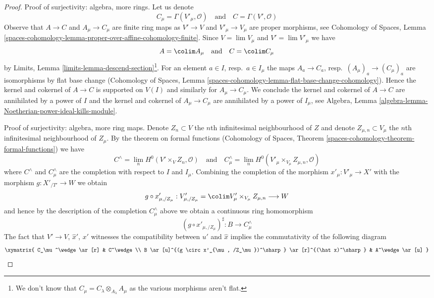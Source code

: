 \begin{proof}
\medskip\noindent
Proof of surjectivity: algebra, more rings.
Let us denote
$$
C_\mu = \Gamma(V'_\mu, \mathcal{O})
\quad\text{and}\quad
C = \Gamma(V', \mathcal{O})
$$
Observe that $A \to C$ and $A_\mu \to C_\mu$ are finite ring maps as
$V' \to V$ and $V'_\mu \to V_\mu$ are proper morphisms, see
Cohomology of Spaces, Lemma
\ref{spaces-cohomology-lemma-proper-over-affine-cohomology-finite}.
Since $V = \lim V_\mu$ and $V' = \lim V'_\mu$
we have
$$
A = \colim A_\mu
\quad\text{and}\quad
C = \colim C_\mu
$$
by Limits, Lemma \ref{limits-lemma-descend-section}\footnote{We don't
know that $C_\mu = C_\lambda \otimes_{A_\lambda} A_\mu$ as the
various morphisms aren't flat.}. For an element
$a \in I$, resp.\ $a \in I_\mu$ the maps $A_a \to C_a$,
resp.\ $(A_\mu)_a \to (C_\mu)_a$ are isomorphisms by flat base change
(Cohomology of Spaces, Lemma
\ref{spaces-cohomology-lemma-flat-base-change-cohomology}).
Hence the kernel and cokernel of $A \to C$ is supported
on $V(I)$ and similarly for $A_\mu \to C_\mu$.
We conclude the kernel and cokernel of $A \to C$
are annihilated by a power of $I$ and the kernel and cokernel of
$A_\mu \to C_\mu$ are annihilated by a power of $I_\mu$, see
Algebra, Lemma \ref{algebra-lemma-Noetherian-power-ideal-kills-module}.

\medskip\noindent
Proof of surjectivity: algebra, more ring maps.
Denote $Z_n \subset V$ the $n$th infinitesimal
neighbourhood of $Z$ and denote $Z_{\mu, n} \subset V_\mu$
the $n$th infinitesimal neighbourhood of $Z_\mu$.
By the theorem on formal functions
(Cohomology of Spaces, Theorem
\ref{spaces-cohomology-theorem-formal-functions})
we have
$$
C^\wedge = \lim_n H^0(V' \times_V Z_n, \mathcal{O})
\quad\text{and}\quad
C_\mu^\wedge =
\lim_n H^0(V'_\mu \times_{V_\mu} Z_{\mu, n}, \mathcal{O})
$$
where $C^\wedge$ and $C_\mu^\wedge$ are the completion with
respect to $I$ and $I_\mu$.
Combining the completion of the morphism
$x'_\mu : V'_\mu \to X'$ with the morphism $g : X'_{/T'} \to W$ we obtain
$$
g \circ x'_{\mu, /Z_\mu} :
V'_{\mu, /Z_\mu} = \colim V_\mu' \times_{V_\mu} Z_{\mu, n}
\longrightarrow
W
$$
and hence by the description of the completion
$C_\mu^\wedge$ above we obtain a continuous ring homomorphism
$$
(g \circ x'_{\mu, /Z_\mu})^\sharp : B \longrightarrow C_\mu^\wedge
$$
The fact that $V' \to V$, $\hat x'$, $x'$ witnesses the compatibility
between $u'$ and $\hat x$ implies the
commutativity of the following diagram
$$
\xymatrix{
C_\mu^\wedge \ar[r] &
C^\wedge \\
B \ar[u]^{(g \circ x'_{\mu, /Z_\mu})^\sharp} \ar[r]^{(\hat x)^\sharp} &
A^\wedge \ar[u]
}
$$


\end{proof}
